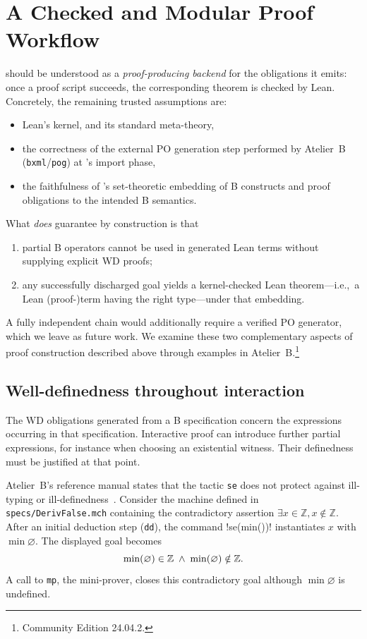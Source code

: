 \section{A Checked and Modular Proof Workflow}
\label{sec:proof-safety}

\barrel should be understood as a \emph{proof-producing backend} for the obligations it emits:
once a proof script succeeds, the corresponding theorem is checked by Lean.
Concretely, the remaining trusted assumptions are:
\begin{itemize}
	\item Lean's kernel, and its standard meta-theory,
	\item the correctness of the external PO generation step performed by Atelier~B (\texttt{bxml}/\texttt{pog}) at \barrel's import phase,
	\item the faithfulness of \barrel's set-theoretic embedding of B constructs and proof obligations to the intended B semantics.
\end{itemize}
What \barrel \emph{does} guarantee by construction is that
\begin{enumerate}
  \item partial B operators cannot be used in generated Lean terms without supplying explicit WD proofs;
  \item any successfully discharged goal yields a kernel-checked Lean theorem---i.e.,\ a Lean (proof-)term having the right type---under that embedding.
\end{enumerate}
A fully independent chain would additionally require a verified PO generator, which we leave as future work.
We examine these two complementary aspects of proof construction described above through examples in Atelier~B.\footnote{Community Edition 24.04.2.}

\subsection{Well-definedness throughout interaction}
\label{sec:lean-ip-comparison}

The WD obligations generated from a B specification concern the expressions occurring in that specification.
Interactive proof can introduce further partial expressions, for instance when choosing an existential witness.
Their definedness must be justified at that point.

Atelier~B's reference manual states that the tactic \texttt{se} does not protect against ill-typing or ill-definedness~\cite[\S4.44]{AtelierBInteractiveProver}.
Consider the machine defined in \texttt{specs/DerivFalse.mch} containing the contradictory assertion \(\exists x \in \mathbb{Z}, x \notin \mathbb{Z}\).
After an initial deduction step (\texttt{dd}), the command \inlineab!se(min({}))! instantiates $x$ with \(\min\varnothing\).
The displayed goal becomes
\[
	\operatorname{min}(\varnothing) \in \mathbb{Z}
	\;\land\;
	\operatorname{min}(\varnothing) \notin \mathbb{Z}.
\]
A call to \texttt{mp}, the mini-prover, closes this contradictory goal although \(\min\varnothing\) is undefined.


